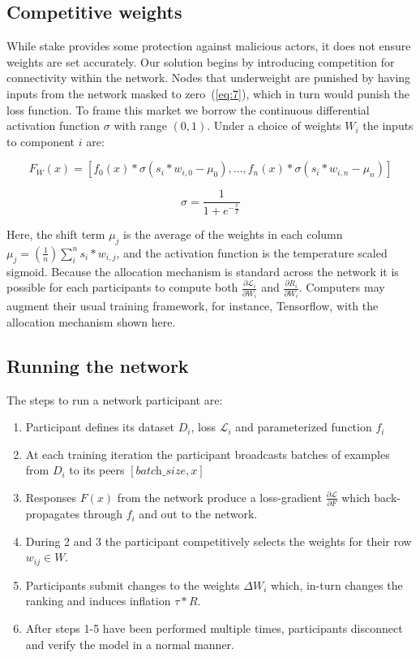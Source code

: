 \documentclass{article}
\begin{document}
\subsection{Competitive weights}
\label{sec:competitive_weights}
While stake provides some protection against malicious actors, it does not ensure weights are set accurately. Our solution begins by introducing competition for connectivity within the network. Nodes that underweight are punished by having inputs from the network masked to zero~(\ref{eq:7}), {\color{blue} which in turn would punish the loss function}. To frame this market we borrow the continuous differential activation function $\sigma$ with range $(0,1)$. Under a choice of weights $W_i$ the inputs to component $i$ are:

\begin{equation}
\label{eq:7}
F_W(x) =  [f_0(x) * \sigma(s_i * w_{i,0} - \mu_0),  ... , f_n(x) * \sigma(s_i * w_{i,n} - \mu_n)]
\end{equation}

\begin{equation}
\sigma =  \frac{1}{ 1 + e^{-\frac{x}{T}} }
\end{equation}

Here, the shift term $\mu_j$ is the average of the weights in each column $\mu_j = (\frac{1}{n}) \sum_{i}^{n}{s_i * w_{i,j}}$, and the activation function is the temperature scaled sigmoid. Because the allocation mechanism is standard across the network it is possible for each participants to compute both $\frac{\partial \mathcal{L}_i}{\partial W_i}$ and $\frac{\partial R_i}{\partial W_i}$. Computers may augment their usual training framework, for instance, Tensorflow, with the allocation mechanism shown here. 

\subsection{Running the network}

The steps to run a network participant are:
\begin{enumerate}
	
	\item Participant defines its dataset $D_i$, loss $\mathcal{L}_i$ and parameterized function $f_i$
	\item  At each training iteration the participant broadcasts batches of examples from $D_i$ to its peers $[\textit{batch\_size}, x]$
	\item Responses $F(x)$ from the network produce a loss-gradient $\frac{\partial \mathcal{L}}{\partial F}$ which back-propagates through $f_i$ and out to the network.
	\item  During 2 and 3 the participant competitively selects the weights for their row $w_{ij} \in W$.
	\item  Participants submit changes to the weights $\Delta W_i$ which, in-turn changes the ranking and induces inflation $\tau * R$.
	\item  {\color{blue} After steps 1-5 have been performed multiple times}, participants disconnect and verify the model in a normal manner.
\end{enumerate}
\end{document}
